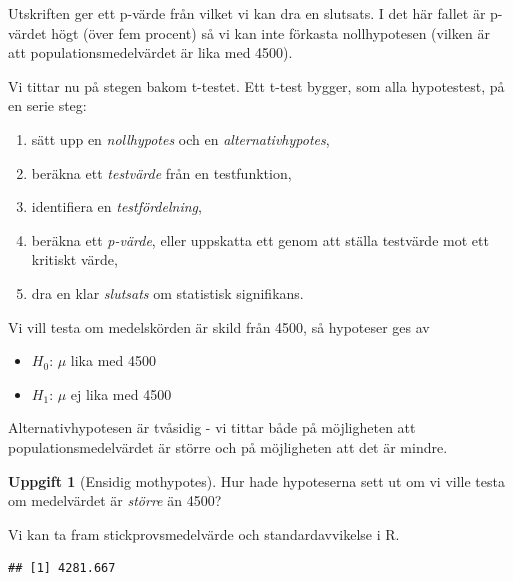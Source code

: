 \documentclass[
]{book}
\newenvironment{Shaded}{\begin{snugshade}}{\end{snugshade}}
\newcommand{\FunctionTok}[1]{\textcolor[rgb]{0.13,0.29,0.53}{\textbf{#1}}}
\newcommand{\NormalTok}[1]{#1}
\newcommand{\SpecialCharTok}[1]{\textcolor[rgb]{0.81,0.36,0.00}{\textbf{#1}}}
\providecommand{\tightlist}{%
  \setlength{\itemsep}{0pt}\setlength{\parskip}{0pt}}
\theoremstyle{definition}
\theoremstyle{definition}
\theoremstyle{definition}
\newtheorem{exercise}{Uppgift}[chapter]
\theoremstyle{definition}
\theoremstyle{remark}
\begin{document}
Utskriften ger ett p-värde från vilket vi kan dra en slutsats. I det här fallet är p-värdet högt (över fem procent) så vi kan inte förkasta nollhypotesen (vilken är att populationsmedelvärdet är lika med 4500).

Vi tittar nu på stegen bakom t-testet.
Ett t-test bygger, som alla hypotestest, på en serie steg:

\begin{enumerate}
\def\labelenumi{\arabic{enumi}.}
\tightlist
\item
  sätt upp en \emph{nollhypotes} och en \emph{alternativhypotes},
\item
  beräkna ett \emph{testvärde} från en testfunktion,
\item
  identifiera en \emph{testfördelning},
\item
  beräkna ett \emph{p-värde}, eller uppskatta ett genom att ställa testvärde mot ett kritiskt värde,
\item
  dra en klar \emph{slutsats} om statistisk signifikans.
\end{enumerate}

Vi vill testa om medelskörden är skild från 4500, så hypoteser ges av

\begin{itemize}
\tightlist
\item
  \(H_0\): \(\mu\) lika med 4500
\item
  \(H_1\): \(\mu\) ej lika med 4500
\end{itemize}

Alternativhypotesen är tvåsidig - vi tittar både på möjligheten att populationsmedelvärdet är större och på möjligheten att det är mindre.

\begin{exercise}[Ensidig mothypotes]
Hur hade hypoteserna sett ut om vi ville testa om medelvärdet är \emph{större} än 4500?
\end{exercise}

Vi kan ta fram stickprovsmedelvärde och standardavvikelse i R.

\begin{Shaded}
\end{Shaded}

\begin{verbatim}
## [1] 4281.667
\end{verbatim}
\end{document}
